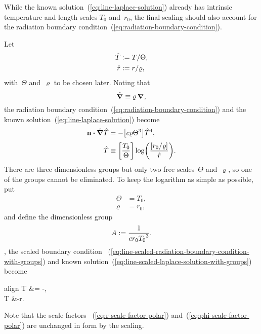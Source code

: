 While the known solution~(\ref{eq:line-laplace-solution})
already has intrinsic temperature and length scales $T_0$ and~$r_0$,
the final scaling should also account for
the radiation boundary condition~(\ref{eq:radiation-boundary-condition}).

Let
\begin{align}
  \hat{T} &:= T / \Theta, \label{eq:line-scaled-temperature} \\
  \hat{r} &:= r / \varrho, \label{eq:line-scaled-r}
\end{align}
with~$\Theta$ and~$\varrho$ to be chosen later.
Noting that
\begin{equation}
  \mathop{}\!\hat{\mathop{}\!\boldsymbol{\mathbf{\nabla}}} \equiv \varrho \mathop{}\!\boldsymbol{\mathbf{\nabla}},
  \label{eq:line-scaled-del}
\end{equation}
the radiation boundary condition~(\ref{eq:radiation-boundary-condition})
and the known solution~(\ref{eq:line-laplace-solution})
become
\begin{align}
  \normalvec \dotp \scaleddel \scaled{T}
    &= -\group{c \varrho \Theta^3} \scaled{T}^4,
    \label{eq:line-scaled-radiation-boundary-condition-with-groups}
    \\[\tallspace]
  \scaled{T}
    &\ideq
      \group{\frac{T_0}{\Theta}}
      \log \roundbr*{\frac{\group{r_0 / \varrho}}{\scaled{r}}}.
    \label{eq:line-scaled-laplace-solution-with-groups}
\end{align}
There are three dimensionless groups
but only two free scales~$\Theta$ and~$\varrho$,
so one of the groups cannot be eliminated.
To keep the logarithm as simple as possible,
put
\begin{align}
  \Theta &= T_0,
    \label{eq:line-temperature-scale} \\
  \varrho &= r_0,
    \label{eq:line-length-scale}
\end{align}
and define the dimensionless group
\begin{equation}
  A := \frac{1}{c r_0 {T_0}^3}.
  \label{eq:line-dimensionless-group}
\end{equation}
, the scaled boundary condition~%
  (\ref{eq:line-scaled-radiation-boundary-condition-with-groups})
and known solution~(\ref{eq:line-scaled-laplace-solution-with-groups})
become
\begin{important}{align}
  \normalvec \dotp \del T &= -,
    \label{eq:line-scaled-radiation-boundary-condition} \\[\tallspace]
  T &\ideq -\log r.
    \label{eq:line-scaled-laplace-solution}
\end{important}
Note that the scale factors~%
  (\ref{eq:r-scale-factor-polar}) and~(\ref{eq:phi-scale-factor-polar})
are unchanged in form by the scaling.

